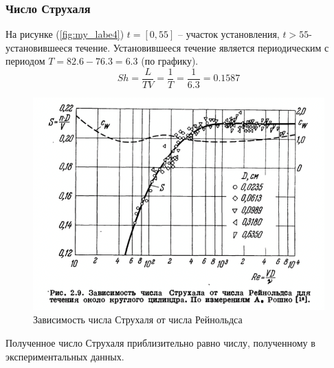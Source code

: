 \documentclass[12pt, a4paper]{article}
\begin{document}
\newpage
\subsubsection{Число Струхаля}
На рисунке (\ref{fig:my_labe4}) $t = [0, 55]$ – участок установления, $t > 55$- установившееся течение. Установившееся течение является периодическим с периодом $T = 82.6 - 76.3 = 6.3$ (по графику).
\begin{equation}
    Sh = \frac{L}{TV} = \frac{1}{T} = \frac{1}{6.3} = 0.1587
\end{equation}

\begin{figure}[H]
    \centering
    \includegraphics[scale=0.9]{figure/Рисунок11.png}
    \caption{Зависимость числа Струхаля от числа Рейнольдса}
    \label{fig:my_labe11}
\end{figure}

Полученное число Струхаля приблизительно равно числу, полученному в экспериментальных данных.
\end{document}
